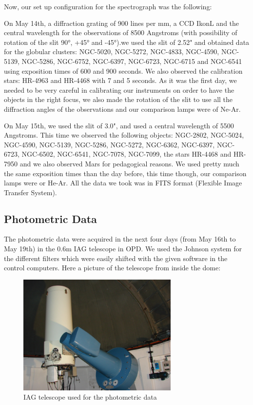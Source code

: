 Now, our set up configuration for the spectrograph was the following:

On May 14th, a diffraction grating of 900 lines per mm, a CCD IkonL and the central wavelength for the observations of 8500 Angstroms (with possibility of rotation of the slit 90°, +45° and -45°).we used the slit of 2.52" and obtained data for the globular clusters: NGC-5020, NGC-5272, NGC-4833, NGC-4590, NGC-5139, NGC-5286, NGC-6752, NGC-6397, NGC-6723, NGC-6715 and NGC-6541 using exposition times of 600 and 900 seconds. We also observed the calibration stars: HR-4963 and HR-4468 with 7 and 5 seconds. As it was the first day, we needed to be very careful in calibrating our instruments on order to have the objects in the right focus, we also made the rotation of the slit to use all the diffraction angles of the observations and our comparison lamps were of Ne-Ar.

On May 15th, we used the slit of 3.0", and used a central wavelength of 5500 Angstroms. This time we observed the following objects: NGC-2802, NGC-5024, NGC-4590, NGC-5139, NGC-5286, NGC-5272, NGC-6362, NGC-6397, NGC-6723, NGC-6502, NGC-6541, NGC-7078, NGC-7099, the stars HR-4468 and HR-7950 and we also observed Mars for pedagogical reasons. We used pretty much the same exposition times than the day before, this time though, our comparison lamps were or He-Ar. All the data we took was in FITS format (Flexible Image Transfer System).

\subsection{Photometric Data}

The photometric data were acquired in the next four days (from May 16th to May 19th) in the 0.6m IAG telescope in OPD. We used the Johnson system for the different filters which were easily shifted with the given software in the control computers. Here a picture of the telescope from inside the dome:

\begin{figure}[h]
\centering
\includegraphics[width=8cm]{images/opd-photometry.jpg}
\caption{IAG telescope used for the photometric data}
\end{figure}

